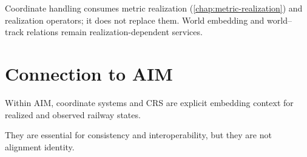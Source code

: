 
Coordinate handling consumes metric realization
(\cref{chap:metric-realization}) and realization operators; it does not
replace them. World embedding and world--track relations remain
realization-dependent services.

\section{Connection to AIM}

\begin{summary}
Within AIM, coordinate systems and CRS are explicit embedding context
for realized and observed railway states.

They are essential for consistency and interoperability, but they are
not alignment identity.
\end{summary}
